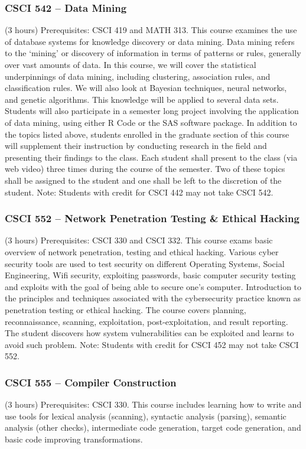 \subsubsection{CSCI 542 -- Data Mining}
(3 hours) Prerequisites: CSCI 419 and MATH 313. This course examines the use of database systems for knowledge discovery or data mining. Data mining refers to the ‘mining’ or discovery of information in terms of patterns or rules, generally over vast amounts of data. In this course, we will cover the statistical underpinnings of data mining, including clustering, association rules, and classification rules. We will also look at Bayesian techniques, neural networks, and genetic algorithms. This knowledge will be applied to several data sets. Students will also participate in a semester long project involving the application of data mining, using either R Code or the SAS software package. In addition to the topics listed above, students enrolled in the graduate section of this course will supplement their instruction by conducting research in the field and presenting their findings to the class. Each student shall present to the class (via web video) three times during the course of the semester. Two of these topics shall be assigned to the student and one shall be left to the discretion of the student. Note: Students with credit for CSCI 442 may not take CSCI 542.

\subsubsection{CSCI 552 -- Network Penetration Testing \& Ethical Hacking}
(3 hours) Prerequisites: CSCI 330 and CSCI 332. This course exams basic overview of network penetration, testing and ethical hacking. Various cyber security tools are used to test security on different Operating Systems, Social Engineering, Wifi security, exploiting passwords, basic computer security testing and exploits with the goal of being able to secure one’s computer. Introduction to the principles and techniques associated with the cybersecurity practice known as penetration testing or ethical hacking. The course covers planning, reconnaissance, scanning, exploitation, post-exploitation, and result reporting. The student discovers how system vulnerabilities can be exploited and learns to avoid such problem. Note: Students with credit for CSCI 452 may not take CSCI 552.

\subsubsection{CSCI 555 -- Compiler Construction}
(3 hours) Prerequisites: CSCI 330. This course includes learning how to write and use tools for lexical analysis (scanning), syntactic analysis (parsing), semantic analysis (other checks), intermediate code generation, target code generation, and basic code improving transformations.

